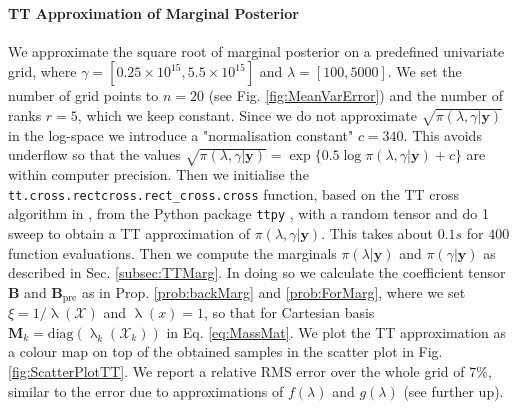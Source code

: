 \paragraph{TT Approximation of Marginal Posterior}
We approximate the square root of marginal posterior on a predefined univariate grid, where $\gamma = [ 0.25 \times 10^{15}, 5.5 \times 10^{15}]$ and $\lambda = [ 100, 5000]$.
We set the number of grid points to $n = 20$ (see Fig. \ref{fig:MeanVarError}) and the number of ranks $r = 5$, which we keep constant.
Since we do not approximate $\sqrt{ \pi( \lambda, \gamma| \bm{y}) }$ in the log-space we introduce a "normalisation constant" $c = 340$. This avoids underflow so that the values $\sqrt{\pi( \lambda,\gamma| \bm{y})} = \exp \{ 0.5 \log  \pi(\lambda,\gamma | \bm{y}) + c \} $ are within computer precision.
Then we initialise the \texttt{tt.cross.rectcross.rect\_cross.cross} function, based on the TT cross algorithm in \cite{OSELEDETS2010TTCross,Dolgov2018TTCross}, from the Python package \texttt{ttpy} \cite{Oseledets2018ttpy}, with a random tensor and do 1 sweep to obtain a TT approximation of $\pi( \lambda,\gamma| \bm{y})$.
This takes about $0.1s$ for $400$ function evaluations.
Then we compute the marginals $\pi(\lambda| \bm{y})$ and $\pi(\gamma| \bm{y})$ as described in Sec. \ref{subsec:TTMarg}.
In doing so we calculate the coefficient tensor $\bm{B}$ and $\bm{B}_{\text{pre}}$ as in Prop. \ref{prob:backMarg} and \ref{prob:ForMarg}, where we set $\xi = 1 / \uplambda (\mathcal{X})$ and $\uplambda(x) = 1$, so that for Cartesian basis $\bm{M}_k = \text{diag}(\uplambda_k(\mathcal{X}_k))$ in Eq. \ref{eq:MassMat}.
We plot the TT approximation as a colour map on top of the obtained samples in the scatter plot in Fig. \ref{fig:ScatterPlotTT}.
We report a relative RMS error over the whole grid of $7\%$, similar to the error due to approximations of $f(\lambda)$ and $g(\lambda)$ (see further up).
